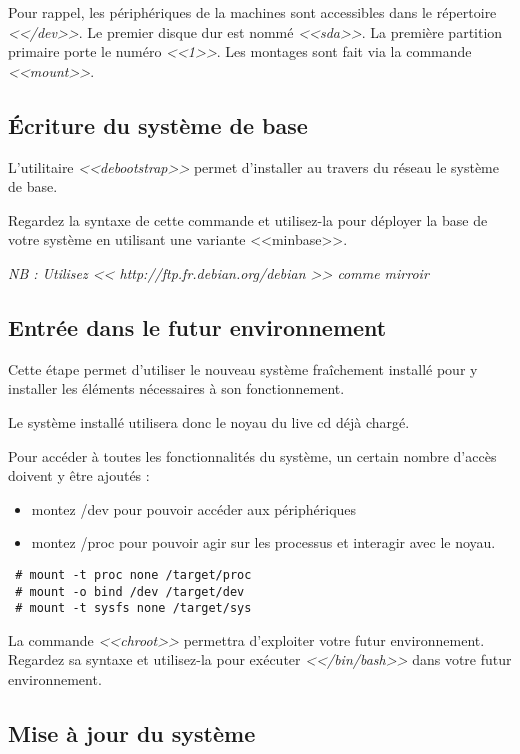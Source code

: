 \documentclass[11pt]{article}
\begin{document}
Pour rappel, les périphériques de la machines sont accessibles dans le
répertoire \emph{<</dev>>}. Le premier disque dur est nommé \emph{<<sda>>}. La
première partition primaire porte le numéro \emph{<<1>>}. Les montages sont
fait via la commande \emph{<<mount>>}.

\subsection{Écriture du système de base}

L'utilitaire \emph{<<debootstrap>>} permet d'installer au travers du réseau le
système de base.

Regardez la syntaxe de cette commande et utilisez-la pour déployer la base de
votre système en utilisant une variante <<minbase>>.

\emph{NB : Utilisez << http://ftp.fr.debian.org/debian >> comme mirroir}

\subsection{Entrée dans le futur environnement}

Cette étape permet d'utiliser le nouveau système fraîchement installé pour y
installer les éléments nécessaires à son fonctionnement.

Le système installé utilisera donc le noyau du live cd déjà chargé.

Pour accéder à toutes les fonctionnalités du système, un certain nombre d'accès
doivent y être ajoutés :

\begin{itemize}
 \item montez /dev pour pouvoir accéder aux périphériques
 \item montez /proc pour pouvoir agir sur les processus et interagir avec le
noyau.
\end{itemize}

\begin{verbatim}
 # mount -t proc none /target/proc
 # mount -o bind /dev /target/dev
 # mount -t sysfs none /target/sys
\end{verbatim}

La commande \emph{<<chroot>>} permettra d'exploiter votre futur environnement.
Regardez sa syntaxe et utilisez-la pour exécuter \emph{<</bin/bash>>} dans
votre futur environnement.

\subsection{Mise à jour du système}
\end{document}
